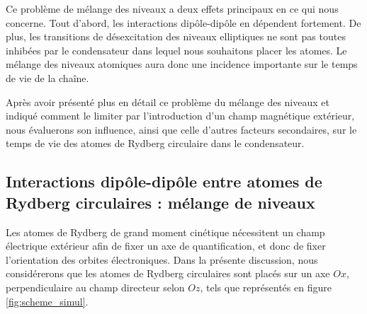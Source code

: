 Ce problème de mélange des niveaux a deux effets principaux en ce qui nous concerne.
Tout d'abord, les interactions dipôle-dipôle en dépendent fortement.
De plus, les transitions de désexcitation des niveaux elliptiques ne sont pas toutes inhibées par le condensateur dans lequel nous souhaitons placer les atomes.
Le mélange des niveaux atomiques aura donc une incidence importante sur le temps de vie de la chaîne.

Après avoir présenté plus en détail ce problème du mélange des niveaux et indiqué comment le limiter par l'introduction d'un champ magnétique extérieur, nous évaluerons son influence, ainsi que celle d'autres facteurs secondaires, sur le temps de vie des atomes de Rydberg circulaire dans le condensateur. 

\subsection{Interactions dipôle-dipôle entre atomes de Rydberg circulaires : mélange de niveaux}
\label{subsec:circ_interactions}

\noindent Les atomes de Rydberg de grand moment cinétique nécessitent un champ électrique extérieur afin de fixer un axe de quantification, et donc de fixer l'orientation des orbites électroniques.
Dans la présente discussion, nous considérerons que les atomes de Rydberg circulaires sont placés sur un axe $Ox$, perpendiculaire au champ directeur selon $Oz$, tels que représentés en figure \eqref{fig:scheme_simul}.


